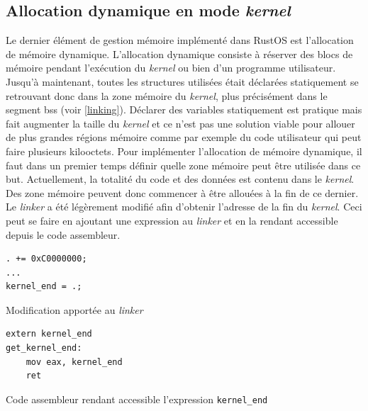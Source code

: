 \subsection{Allocation dynamique en mode \textit{kernel}}
\label{alloc_kernel}
Le dernier élément de gestion mémoire implémenté dans RustOS est l'allocation de
mémoire dynamique. L'allocation dynamique consiste à réserver des blocs de mémoire
pendant l'exécution du \textit{kernel} ou bien d'un programme utilisateur. Jusqu'à
maintenant, toutes les structures utilisées était déclarées statiquement se retrouvant
donc dans la zone mémoire du \textit{kernel}, plus précisément dans le segment
bss (voir \ref{linking}). Déclarer des variables statiquement est pratique mais fait
augmenter la taille du \textit{kernel} et ce n'est pas une solution viable
pour allouer de plus grandes régions mémoire comme par exemple du code utilisateur
qui peut faire plusieurs kilooctets. Pour implémenter l'allocation de mémoire
dynamique, il faut dans un premier temps définir quelle zone mémoire peut être
utilisée dans ce but. Actuellement, la totalité du code et des données est contenu
dans le \textit{kernel}. Des zone mémoire peuvent donc commencer à être allouées
à la fin de ce dernier. Le \textit{linker} a été légèrement modifié afin d'obtenir
l'adresse de la fin du \textit{kernel}. Ceci peut se faire en ajoutant une expression
au \textit{linker} et en la rendant accessible depuis le code assembleur. \\

\begin{code}
\begin{verbatim}
. += 0xC0000000;
...
kernel_end = .;
\end{verbatim}
\caption{Modification apportée au \textit{linker}}
\label{lst:mem:alloc:linker}
\end{code} \bigbreak

\begin{code}
\begin{verbatim}
extern kernel_end
get_kernel_end:
    mov eax, kernel_end
    ret
\end{verbatim}
\caption{Code assembleur rendant accessible l'expression \texttt{kernel_end}}
\label{lst:mem:alloc:kernel_end}
\end{code} \bigbreak

